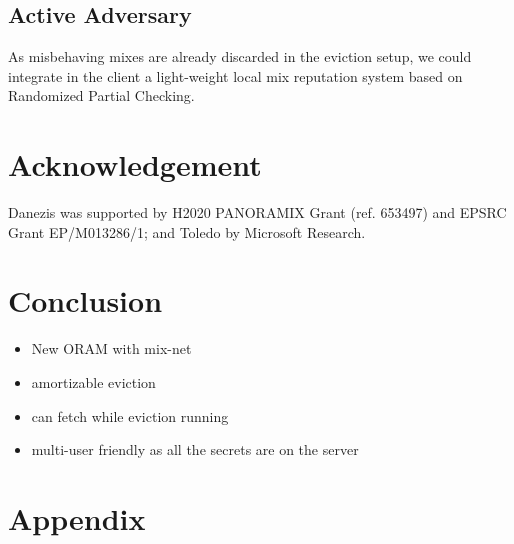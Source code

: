 \documentclass[USenglish,oneside,twocolumn]{article}
\begin{document}
\subsection{Active Adversary}\label{Active Adversary}
As misbehaving mixes are already discarded in the eviction setup, we could integrate in the client a light-weight local mix reputation system based on Randomized Partial Checking.


\section{Acknowledgement}
Danezis was supported by H2020  PANORAMIX Grant (ref. 653497) and EPSRC Grant EP/M013286/1; and Toledo by Microsoft Research.


\section{Conclusion}\label{Conclusion}
\begin{itemize}
 \item New ORAM with mix-net
 \item amortizable eviction
 \item can fetch while eviction running
 \item multi-user friendly as all the secrets are on the server
\end{itemize}




\section{Appendix}
\end{document}
